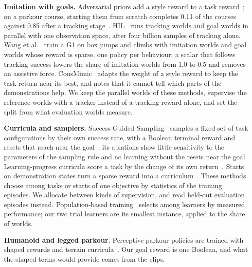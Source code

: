 \textbf{Imitation with goals.} Adversarial priors add a style reward to a task reward~\cite{amp,amphardware}; on a parkour course, starting them from scratch completes 0.11 of the courses against 0.85 after a tracking stage~\cite{hil}. HIL~\cite{hil} runs tracking worlds and goal worlds in parallel with one observation space, after four billion samples of tracking alone. Wang et al.~\cite{wang2026generalizing} train a G1 on box jumps and climbs with imitation worlds and goal worlds whose reward is sparse, one policy per behaviour; a scalar that follows tracking success lowers the share of imitation worlds from 1.0 to 0.5 and removes an assistive force. ConsMimic~\cite{consmimic} adapts the weight of a style reward to keep the task return near its best, and notes that it cannot tell which parts of the demonstrations help. We keep the parallel worlds of these methods, supervise the reference worlds with a tracker instead of a tracking reward alone, and set the split from what evaluation worlds measure.

\textbf{Curricula and samplers.} Success Guided Sampling~\cite{sgs} samples a fixed set of task configurations by their own success rate, with a Boolean terminal reward and resets that reach near the goal~\cite{omnireset}; its ablations show little sensitivity to the parameters of the sampling rule and no learning without the resets near the goal. Learning-progress curricula score a task by the change of its own return~\cite{lpacrl,graves2017automated}. Starts on demonstration states turn a sparse reward into a curriculum~\cite{florensa2017reverse,demostart,scout,goexplore}. These methods choose among tasks or starts of one objective by statistics of the training episodes. We allocate between kinds of supervision, and read held-out evaluation episodes instead. Population-based training~\cite{pbt} selects among learners by measured performance; our two trial learners are its smallest instance, applied to the share of worlds.

\textbf{Humanoid and legged parkour.} Perceptive parkour policies are trained with shaped rewards and terrain curricula~\cite{zhuang2023robot,cheng2024extreme,hoeller2024anymal,zhuang2024humanoid}. Our goal reward is one Boolean, and what the shaped terms would provide comes from the clips.


